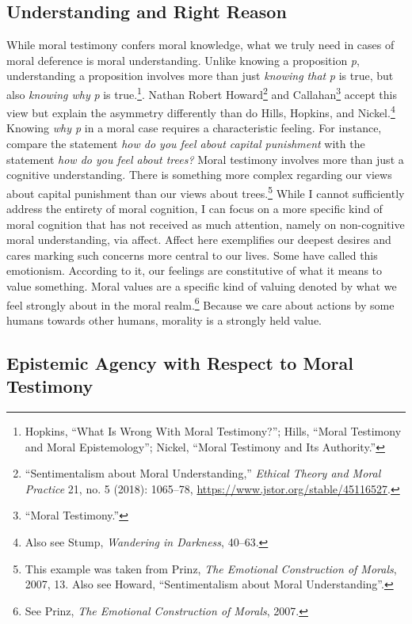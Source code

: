 \documentclass[phdthesis,12pt,final]{wuthesis}
\theoremstyle{definition}
\theoremstyle{definition}
\theoremstyle{definition}
\theoremstyle{definition}
\theoremstyle{remark}
\begin{document}
\subsection*{Understanding and Right Reason}\label{understanding-and-right-reason}

While moral testimony confers moral knowledge, what we truly need in cases of moral deference is moral understanding. Unlike knowing a proposition \emph{p}, understanding a proposition involves more than just \emph{knowing that} \emph{p} is true, but also \emph{knowing why} \emph{p} is true.\footnote{Hopkins, {``What {Is Wrong With Moral Testimony}?''}; Hills, {``Moral Testimony and Moral Epistemology''}; Nickel, {``Moral {Testimony} and Its {Authority}.''}}. Nathan Robert Howard\footnote{{``Sentimentalism about {Moral Understanding},''} \emph{Ethical Theory and Moral Practice} 21, no. 5 (2018): 1065--78, \url{https://www.jstor.org/stable/45116527}.} and Callahan\footnote{{``Moral {Testimony}.''}} accept this view but explain the asymmetry differently than do Hills, Hopkins, and Nickel.\footnote{Also see Stump, \emph{Wandering in {Darkness}}, 40--63.} Knowing \emph{why p} in a moral case requires a characteristic feeling. For instance, compare the statement \emph{how do you feel about capital punishment} with the statement \emph{how do you feel about trees?} Moral testimony involves more than just a cognitive understanding. There is something more complex regarding our views about capital punishment than our views about trees.\footnote{This example was taken from Prinz, \emph{The {Emotional Construction} of {Morals}}, 2007, 13. Also see Howard, {``Sentimentalism about {Moral Understanding}''}.} While I cannot sufficiently address the entirety of moral cognition, I can focus on a more specific kind of moral cognition that has not received as much attention, namely on non-cognitive moral understanding, via affect. Affect here exemplifies our deepest desires and cares marking such concerns more central to our lives. Some have called this emotionism. According to it, our feelings are constitutive of what it means to value something. Moral values are a specific kind of valuing denoted by what we feel strongly about in the moral realm.\footnote{See Prinz, \emph{The {Emotional Construction} of {Morals}}, 2007.} Because we care about actions by some humans towards other humans, morality is a strongly held value.

\subsection*{Epistemic Agency with Respect to Moral Testimony}\label{epistemic-agency-with-respect-to-moral-testimony}
\end{document}
